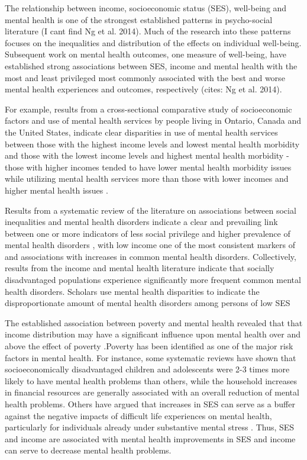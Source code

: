\documentclass{article}
\begin{document}

The relationship between income, socioeconomic status (SES), well-being and mental health is one of the strongest established patterns in psycho-social literature \citep{Easterlin1974Jan, holzer1986increased, Perry1996Sep} (I cant find Ng et al. 2014). Much of the research into these patterns focuses on the inequalities and distribution of the effects on individual well-being. Subsequent work on mental health outcomes, one measure of well-being, have established strong associations between SES, income and mental health with the most and least privileged most commonly associated with the best and worse mental health experiences and outcomes, respectively \citep{Sevenson2008Aug}(cites: Ng et al. 2014). 

For example, results from a cross-sectional comparative study of socioeconomic factors and use of mental health services by people living in Ontario, Canada and the United States, indicate clear disparities in use of mental health services between those with the highest income levels and lowest mental health morbidity and those with the lowest income levels and highest mental health morbidity - those with higher incomes tended to have lower mental health morbidity issues while utilizing mental health services more than those with lower incomes and higher mental health issues \citep{Katz1997}. 

Results from a systematic review of the literature on associations between social inequalities and mental health disorders indicate a clear and prevailing link between  one or more indicators of less social privilege and higher prevalence of mental health disorders \citep{Fryers2003}, with low income one of the most consistent markers of and associations with increases in common mental health disorders. Collectively, results from the income and mental health literature indicate that socially disadvantaged populations experience significantly more frequent common mental health disorders. Scholars use mental health disparities to indicate the disproportionate amount of mental health disorders among persons of low SES \citep{RN1292}

The established association between poverty and mental health revealed that that income distribution may have a significant influence upon mental health over and above the effect of poverty \citep{HANANDITA201459}.Poverty has been identified as one of the major risk factors in mental health. For instance, some systematic reviews have shown that socioeconomically disadvantaged children and adolescents were 2-3 times more likely to have mental health problems than others\citep{REISS201324}, while the household increases in financial resources are generally associated with an overall reduction of mental health problems\citep{2015Does}. Others have argued that increases in SES can serve as a buffer against the negative impacts of difficult life experiences on mental health, particularly for individuals already under substantive mental stress \citep{Kawachi2001Sep}. Thus, SES and income are associated with mental health improvements in SES and income can serve to decrease mental health problems.
\end{document}
